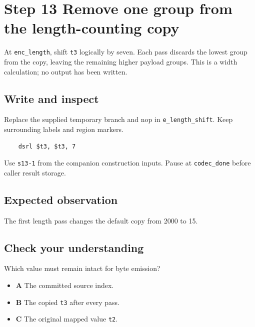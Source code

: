 \section{Step 13 Remove one group from the length-counting copy}\label{delta-s13}

At \texttt{enc\_length}, shift \texttt{t3} logically by seven. Each pass discards the lowest group from the copy, leaving the remaining higher payload groups. This is a width calculation; no output has been written.

\subsection{Write and inspect}
Replace the supplied temporary branch and nop in \texttt{e\_length\_shift}. Keep surrounding labels and region markers.

\begin{verbatim}
    dsrl $t3, $t3, 7
\end{verbatim}
Use \texttt{s13-1} from the companion construction inputs. Pause at \texttt{codec\_done} before caller result storage.

\subsection{Expected observation}
The first length pass changes the default copy from 2000 to 15.

\subsection{Check your understanding}
Which value must remain intact for byte emission?

\begin{itemize}
\item \textbf{A} The committed source index.
\item \textbf{B} The copied \texttt{t3} after every pass.
\item \textbf{C} The original mapped value \texttt{t2}.
\end{itemize}
